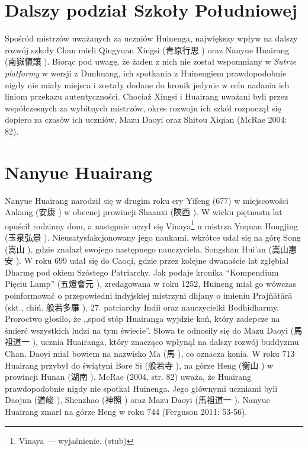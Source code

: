 \section{Dalszy podział Szkoły Południowej}
Spośród mistrzów uważanych za uczniów Huinenga, największy wpływ na dalszy rozwój szkoły Chan mieli Qingyuan Xingsi (青原行思 ) oraz Nanyue Huairang (南嶽懷讓 ).
Biorąc pod uwagę, że żaden z nich nie został wspomniany w \textit{Sutrze platformy} w wersji z Dunhuang, ich spotkania z Huinengiem prawdopodobnie nigdy nie miały miejsca i zostały dodane do kronik jedynie w celu nadania ich liniom przekazu autentyczności.
Chociaż Xingsi i Huairang uważani byli przez współczesnych za wybitnych mistrzów, okres rozwoju ich szkół rozpoczął się dopiero za czasów ich uczniów, Mazu Daoyi oraz Shitou Xiqian %
(McRae 2004: 82).

\section{Nanyue Huairang}
Nanyue Huairang narodził się w drugim roku ery Yifeng (677) w miejscowości Ankang (安康 ) w obecnej prowincji Shaanxi (陝西 ).
W wieku piętnastu lat opuścił rodzinny dom, a następnie uczył się Vinaya\footnote{Vinaya --- wyjaśnienie. (stub)} u mistrza Yuquan Hongjing (玉泉弘景 ).
Nieusatysfakcjonowany jego naukami, wkrótce udał się na górę Song (嵩山 ), gdzie znalazł swojego następnego nauczyciela, Songshan Hui'an (嵩山惠安 ).
W roku 699 udał się do Caoqi, gdzie przez kolejne dwanaście lat zgłębiał Dharmę pod okiem Szóstego Patriarchy.
Jak podaje kronika ``Kompendium Pięciu Lamp'' (五燈會元 ), zredagowana w roku 1252, Huineng miał go wówczas poinformować o przepowiedni indyjskiej mistrzyni dhjany o imieniu Prajñātārā (skt., chiń. 般若多羅 ), 27. patriarchy Indii oraz nauczycielki Bodhidharmy.
Proroctwo głosiło, że ,,spod stóp Huairanga wyjdzie koń, który zadepcze na śmierć wszystkich ludzi na tym świecie''.
Słowa te odnosiły się do Mazu Daoyi (馬祖道一 ), ucznia Huairanga, który znacząco wpłynął na dalszy rozwój buddyzmu Chan.
Daoyi miał bowiem na nazwisko Ma (馬 ), co oznacza konia.
W roku 713 Huairang przybył do świątyni Bore Si (般若寺 ), na górze Heng (衡山 ) w prowincji Hunan (湖南 ).
McRae (2004, str. 82) uważa, że Huairang prawdopodobnie nigdy nie spotkał Huinenga.
Jego głównymi uczniami byli Daojun (道峻 ), Shenzhao (神照 ) oraz Mazu Daoyi (馬祖道一 ).
Nanyue Huairang zmarł na górze Heng w roku 744
(Ferguson 2011: 53-56).

